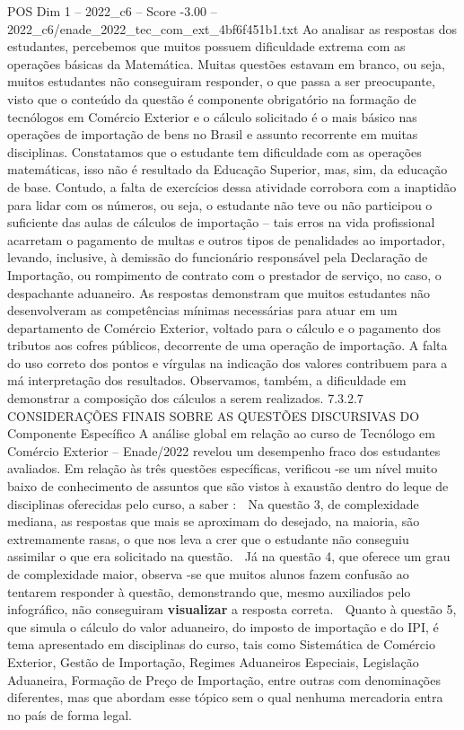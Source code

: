 \begin{textsample}{POS Dim 1 – 2022\_c6 – Score -3.00 – 2022\_c6/enade\_2022\_tec\_com\_ext\_4bf6f451b1.txt}
Ao analisar as respostas dos estudantes, percebemos que muitos possuem dificuldade extrema com as operações básicas da Matemática.
Muitas questões estavam em branco, ou seja, muitos estudantes não conseguiram responder, o que passa a ser preocupante, visto que o conteúdo da questão é componente obrigatório na formação de tecnólogos em Comércio Exterior e o cálculo solicitado é o mais básico nas operações de importação de bens no Brasil e assunto recorrente em muitas disciplinas.
Constatamos que o estudante tem dificuldade com as operações matemáticas, isso não é resultado da Educação Superior, mas, sim, da educação de base.
Contudo, a falta de exercícios dessa atividade corrobora com a inaptidão para lidar com os números, ou seja, o estudante não teve ou não participou o suficiente das aulas de cálculos de importação – tais erros na vida profissional acarretam o pagamento de multas e outros tipos de penalidades ao importador, levando, inclusive, à demissão do funcionário responsável pela Declaração de Importação, ou rompimento de contrato com o prestador de serviço, no caso, o despachante aduaneiro.
As respostas demonstram que muitos estudantes não desenvolveram as competências mínimas necessárias para atuar em um departamento de Comércio Exterior, voltado para o cálculo e o pagamento dos tributos aos cofres públicos, decorrente de uma operação de importação.
A falta do uso correto dos pontos e vírgulas na indicação dos valores contribuem para a má interpretação dos resultados.
Observamos, também, a dificuldade em demonstrar a composição dos cálculos a serem realizados. 7.3.2.7 CONSIDERAÇÕES FINAIS SOBRE AS QUESTÕES DISCURSIVAS DO Componente Específico A análise global em relação ao curso de Tecnólogo em Comércio Exterior – Enade/2022 revelou um desempenho fraco dos estudantes avaliados.
Em relação às três questões específicas, verificou -se um nível muito baixo de conhecimento de assuntos que são vistos à exaustão dentro do leque de disciplinas oferecidas pelo curso, a saber :  Na questão 3, de complexidade mediana, as respostas que mais se aproximam do desejado, na maioria, são extremamente rasas, o que nos leva a crer que o estudante não conseguiu assimilar o que era solicitado na questão.  Já na questão 4, que oferece um grau de complexidade maior, observa -se que muitos alunos fazem confusão ao tentarem responder à questão, demonstrando que, mesmo auxiliados pelo infográfico, não conseguiram \textbf{visualizar} a resposta correta.  Quanto à questão 5, que simula o cálculo do valor aduaneiro, do imposto de importação e do IPI, é tema apresentado em disciplinas do curso, tais como Sistemática de Comércio Exterior, Gestão de Importação, Regimes Aduaneiros Especiais, Legislação Aduaneira, Formação de Preço de Importação, entre outras com denominações diferentes, mas que abordam esse tópico sem o qual nenhuma mercadoria entra no país de forma legal.

\end{textsample}
